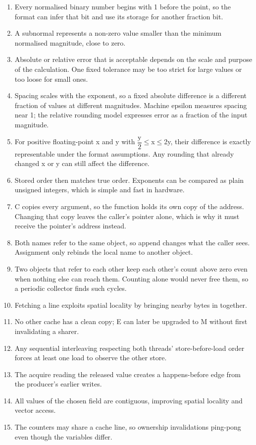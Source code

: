 \documentclass[11pt]{article}
\begin{document}
\begin{keepsection}
\begin{enumerate}
\item Every normalised binary number begins with 1 before the point, so the format can infer that bit and use its storage for another fraction bit.
\item A subnormal represents a non-zero value smaller than the minimum normalised magnitude, close to zero.
\item Absolute or relative error that is acceptable depends on the scale and purpose of the calculation. One fixed tolerance may be too strict for large values or too loose for small ones.
\item Spacing scales with the exponent, so a fixed absolute difference is a different fraction of values at different magnitudes. Machine epsilon measures spacing near 1; the relative rounding model expresses error as a fraction of the input magnitude.
\item For positive floating-point x and y with {\small\ensuremath{\dfrac{\mathrm{y}}{2}}}\ensuremath{\leq}x\ensuremath{\leq}2y, their difference is exactly representable under the format assumptions. Any rounding that already changed x or y can still affect the difference.
\item Stored order then matches true order. Exponents can be compared as plain unsigned integers, which is simple and fast in hardware.
\item C copies every argument, so the function holds its own copy of the address. Changing that copy leaves the caller’s pointer alone, which is why it must receive the pointer’s address instead.
\item Both names refer to the same object, so append changes what the caller sees. Assignment only rebinds the local name to another object.
\item Two objects that refer to each other keep each other’s count above zero even when nothing else can reach them. Counting alone would never free them, so a periodic collector finds such cycles.
\item Fetching a line exploits spatial locality by bringing nearby bytes in together.
\item No other cache has a clean copy; E can later be upgraded to M without first invalidating a sharer.
\item Any sequential interleaving respecting both threads’ store-before-load order forces at least one load to observe the other store.
\item The acquire reading the released value creates a happens-before edge from the producer’s earlier writes.
\item All values of the chosen field are contiguous, improving spatial locality and vector access.
\item The counters may share a cache line, so ownership invalidations ping-pong even though the variables differ.
\end{enumerate}

\end{keepsection}
\end{document}

